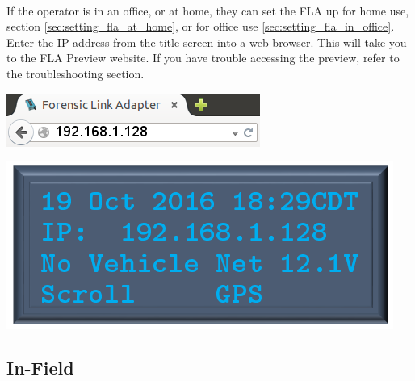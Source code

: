 \documentclass[11pt, oneside]{book}
\begin{document}
\paragraph{  }
If the operator is in an office, or at home, they can set the FLA up for home use, section \ref{sec:setting_fla_at_home}, or for office use \ref{sec:setting_fla_in_office}. Enter the IP address from the title screen into a web browser. This will take you to the FLA Preview website. If you have trouble accessing the preview, refer to the troubleshooting section.
\\[\baselineskip]
\noindent\begin{minipage}{0.45\textwidth}%
	\includegraphics[width=\linewidth]{../media/fla_preview_screenshots/url_correct_2} 
\end{minipage}%
\hfill%
\begin{minipage}{0.45\textwidth} 
	\includegraphics[width=\linewidth]{../media/pstricks_files/01_main_screen_1_128_ip}
\end{minipage}
\subsection{In-Field}
\end{document}

